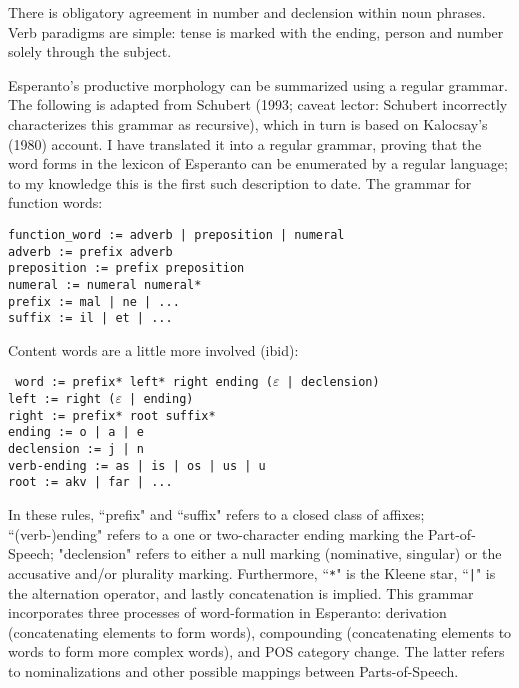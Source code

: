 \documentclass[10pt,a4paper]{article}
\begin{document}
There is obligatory agreement in number and declension within noun phrases.
Verb paradigms are simple: tense is marked with the ending, person and number
solely through the subject.

Esperanto's productive morphology can be summarized using a regular
grammar. The following is adapted from Schubert (1993; caveat lector: Schubert
incorrectly characterizes this grammar as recursive), which in turn is based
on Kalocsay's (1980) account. I have translated it into a regular grammar,
proving that the word forms in the lexicon of Esperanto can be enumerated by a
regular language; to my knowledge this is the first such description to date.
The grammar for function words: 

\begin{verbatim}
function_word := adverb | preposition | numeral
adverb := prefix adverb
preposition := prefix preposition
numeral := numeral numeral*
prefix := mal | ne | ...
suffix := il | et | ...
\end{verbatim}

Content words are a little more involved (ibid):

\texttt{
word := prefix* left* right ending ($\varepsilon$ | declension) \\
left := right ($\varepsilon$ | ending) \\
right := prefix* root suffix* \\
ending := o | a | e \\
declension := j | n \\
verb-ending := as | is | os | us | u \\
root := akv | far | ...
}

In these rules, ``prefix" and ``suffix" refers to a closed class of affixes;
``(verb-)ending" refers to a one or two-character ending marking the
Part-of-Speech; "declension" refers to either a null marking (nominative,
singular) or the accusative and/or plurality marking. Furthermore,
``\texttt{*}" is the Kleene star, ``\texttt{|}" is the alternation operator,
and lastly concatenation is implied. This grammar incorporates three processes
of word-formation in Esperanto: derivation (concatenating elements to form
words), compounding (concatenating elements to words to form more complex
words), and POS category change.  The latter refers to nominalizations and
other possible mappings between Parts-of-Speech.
\end{document}
